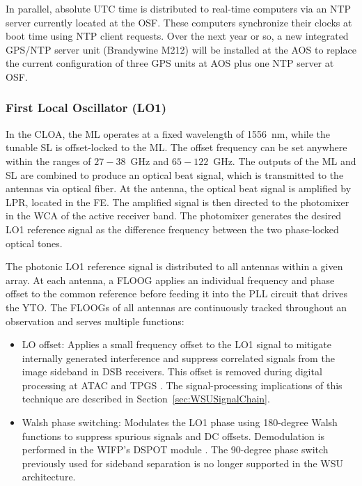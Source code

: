 In parallel, absolute \ac{UTC} time is distributed to real-time computers via an \ac{NTP} server currently located at the \ac{OSF}.
These computers synchronize their clocks at boot time using \ac{NTP} client requests.
Over the next year or so, a new integrated \ac{GPS}/\ac{NTP} server unit (Brandywine M212) will be installed at the \ac{AOS} to replace the current configuration of three \ac{GPS} units at \ac{AOS} plus one \ac{NTP} server at \ac{OSF}.


\subsubsection{First Local Oscillator (LO1)}
\label{sec:LO1}

In the \ac{CLOA}, the \ac{ML} operates at a fixed wavelength of 1556~nm, while the tunable \ac{SL} is offset-locked to the \ac{ML}.
The offset frequency can be set anywhere within the ranges of $27-38$~GHz and $65-122$~GHz.
The outputs of the \ac{ML} and \ac{SL} are combined to produce an optical beat signal, which is transmitted to the antennas via optical fiber.
At the antenna, the optical beat signal is amplified by \ac{LPR}, located in the FE. 
The amplified signal is then directed to the photomixer in the \ac{WCA} of the active receiver band. 
The photomixer generates the desired \ac{LO1} reference signal as the difference frequency between the two phase-locked optical tones.

The photonic \ac{LO1} reference signal is distributed to all antennas within a given array. 
At each antenna, a \ac{FLOOG} applies an individual frequency and phase offset to the common reference before feeding it into the \ac{PLL} circuit that drives the \ac{YTO}. 
The \acp{FLOOG} of all antennas are continuously tracked throughout an observation and serves multiple functions:
\begin{itemize}[itemsep=-0.5em]
    \item \ac{LO} offset: Applies a small frequency offset to the \ac{LO1} signal to mitigate internally generated interference and suppress correlated signals from the image sideband in \ac{DSB} receivers. This offset is removed during digital processing at \ac{ATAC} and \ac{TPGS} \cite{atac_sdd} \cite{TPGS_cosdd}. The signal-processing implications of this technique are described in Section~\ref{sec:WSUSignalChain}.
    \item Walsh phase switching: Modulates the \ac{LO1} phase using 180-degree Walsh functions to suppress spurious signals and DC offsets. Demodulation is performed in the WIFP’s DSPOT module \cite{WIFPDescription}. The 90-degree phase switch previously used for sideband separation is no longer supported in the \ac{WSU} architecture.
\end{itemize}

